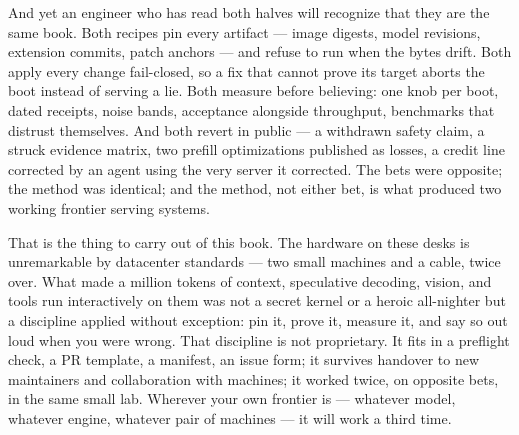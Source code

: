 And yet an engineer who has read both halves will recognize that they are
the same book. Both recipes pin every artifact --- image digests, model
revisions, extension commits, patch anchors --- and refuse to run when the
bytes drift. Both apply every change fail-closed, so a fix that cannot
prove its target aborts the boot instead of serving a lie. Both measure
before believing: one knob per boot, dated receipts, noise bands,
acceptance alongside throughput, benchmarks that distrust themselves. And
both revert in public --- a withdrawn safety claim, a struck evidence
matrix, two prefill optimizations published as losses, a credit line
corrected by an agent using the very server it corrected. The bets were
opposite; the method was identical; and the method, not either bet, is
what produced two working frontier serving systems.

That is the thing to carry out of this book. The hardware on these desks
is unremarkable by datacenter standards --- two small machines and a
cable, twice over. What made a million tokens of context, speculative
decoding, vision, and tools run interactively on them was not a secret
kernel or a heroic all-nighter but a discipline applied without exception:
pin it, prove it, measure it, and say so out loud when you were wrong.
That discipline is not proprietary. It fits in a preflight check, a PR
template, a manifest, an issue form; it survives handover to new
maintainers and collaboration with machines; it worked twice, on opposite
bets, in the same small lab. Wherever your own frontier is --- whatever
model, whatever engine, whatever pair of machines --- it will work a third
time.
